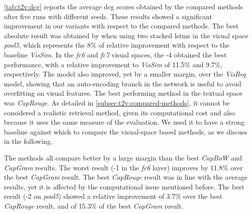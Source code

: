 \ref{tab:t2v:dcg} reports the average \gls{dcg} scores obtained by the compared methods after five runs with different seeds. %
These results showed a significant improvement in our \ttv{} variants with respect to the compared methods.
The best absolute result was obtained by \widedeepttv{} when using two stacked \glspl{lstm} in the visual space \emph{pool5}, which represents the 8\% of relative improvement with respect to the baseline \emph{VisSim}.
In the \emph{fc6} and \emph{fc7} visual spaces, the \widedeepttv{}-4 obtained the best performance, with a relative improvement to \emph{VisSim} of 11.5\% and 9.7\%, respectively.
The \sparsettv{} model also improved, yet by a smaller margin, over the \emph{VisReg} model, showing that an auto-encoding branch in the network is useful to avoid overfitting on visual features.
The best performing method in the textual space was \emph{CapRouge}.
As detailed in \ref{subsec:t2v:compared-methods}, it cannot be considered a realistic retrieval method, given its computational cost and also because it uses the same measure of the evaluation.
We used it to have a strong baseline against which to compare the visual-space based methods, as we discuss in the following.

The \ttv{} methods all compare better by a large margin than the best \emph{CapBoW} and \emph{CapGram} results.
The worst \ttv{} result (\densettv{}-1 in the \emph{fc6} layer) improves by 11.8\% over the best \emph{CapGram} result.
The best \emph{CapRouge} result was in line with the average \ttv{} results, yet it is affected by the computational issue mentioned before.
The best \ttv{} result (\widedeepttv{}-2 on \emph{pool5}) showed a relative improvement of 3.7\% over the best \emph{CapRouge} result, and of 15.3\% of the best \emph{CapGram} result.

